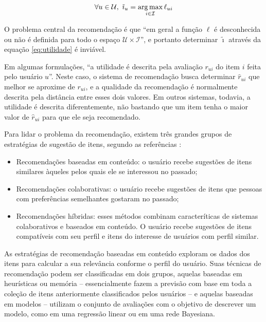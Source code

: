 \begin{equation} 
\label{eq:utilidade}
\forall u \in \mathcal{U}, ~ \tilde{\imath}_u = \operatorname*{arg\,max}_{i \in \mathcal{I}}{\ell_{ui}}
\end{equation}

O problema central da recomendação é que ``em geral a função $\ell$ é desconhecida ou não é definida para todo o espaço $\mathcal{U} \times \mathcal{I}$'', e portanto determinar $\tilde{\imath}$ através da equação \ref{eq:utilidade} é inviável. 

Em algumas formulações, ``a utilidade é descrita pela avaliação $r_{ui}$ do item $i$ feita pelo usuário $u$''. Neste caso, o sistema de recomendação busca determinar $\hat{r}_{ui}$ que melhor se aproxime de $r_{ui}$, e a qualidade da recomendação é normalmente descrita pela distância entre esses dois valores. Em outros sistemas, todavia, a utilidade é descrita diferentemente, não bastando que um item tenha o maior valor de $\hat{r}_{ui}$ para que ele seja recomendado. 

Para lidar o problema da recomendação, existem três grandes grupos de estratégias de sugestão de itens, segundo as referências \cite{adomavicius2005toward,balabanovic97fab}:

\begin{itemize}
\item Recomendações baseadas em conteúdo: o usuário recebe sugestões de itens similares àqueles pelos quais ele se interessou no passado;
\item Recomendações colaborativas: o usuário recebe sugestões de itens que pessoas com preferências semelhantes gostaram no passado;
\item Recomendações híbridas: esses métodos combinam caracteríticas de sistemas colaborativos e baseados em conteúdo.  O usuário recebe sugestões de itens compatíveis com seu perfil e itens do interesse de usuários com perfil similar.
\end{itemize}

As estratégias de recomendação baseadas em conteúdo exploram os dados dos itens para calcular a sua relevância conforme o perfil do usuário. Suas técnicas de recomendação podem ser classificadas em dois grupos, aquelas baseadas em heurísticas ou memória -- essencialmente fazem a previsão com base em toda a coleção de itens anteriormente classificados pelos usuários -- e aquelas baseadas em modelos -- utilizam o conjunto de avaliações com o objetivo de descrever um modelo, como em uma regressão linear ou em uma rede Bayesiana. 


